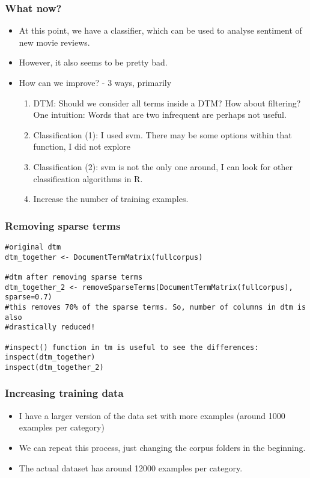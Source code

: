 \documentclass{beamer}
\begin{document}
\begin{frame}
\frametitle{What now?}
\begin{itemize}
\item At this point, we have a classifier, which can be used to analyse sentiment of new movie reviews.
\item However, it also seems to be pretty bad. \pause
\item How can we improve? - 3 ways, primarily
\begin{enumerate}
\item DTM: Should we consider all terms inside a DTM? How about filtering? One intuition: Words that are two infrequent are perhaps not useful.
\item Classification (1): I used svm. There may be some options within that function, I did not explore
\item Classification (2): svm is not the only one around, I can look for other classification algorithms in R. 
\item Increase the number of training examples. 
\end{enumerate}
\end{itemize}
\end{frame}

\begin{frame}[fragile]
\frametitle{Removing sparse terms}
\scriptsize
\begin{verbatim}
#original dtm
dtm_together <- DocumentTermMatrix(fullcorpus)

#dtm after removing sparse terms
dtm_together_2 <- removeSparseTerms(DocumentTermMatrix(fullcorpus), sparse=0.7)
#this removes 70% of the sparse terms. So, number of columns in dtm is also
#drastically reduced!

#inspect() function in tm is useful to see the differences:
inspect(dtm_together)
inspect(dtm_together_2)
\end{verbatim}
\end{frame}

\begin{frame}
\frametitle{Increasing training data}
\begin{itemize}
\item I have a larger version of the  data set with more examples (around 1000 examples per category)
\item We can repeat this process, just changing the corpus folders in the beginning.
\item The actual dataset has around 12000 examples per category. 
\end{itemize}
\end{frame}
\end{document}
